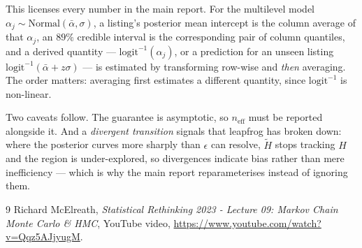 \documentclass[10pt,a4paper]{article}
\theoremstyle{definition}
\begin{document}
This licenses every number in the main report. For the multilevel model
$\alpha_{j} \sim \mathrm{Normal}(\bar\alpha, \sigma)$, a listing's posterior
mean intercept is the column average of that $\alpha_{j}$, an $89\%$ credible
interval is the corresponding pair of column quantiles, and a derived quantity
--- $\mathrm{logit}^{-1}(\alpha_{j})$, or a prediction for an unseen listing
$\mathrm{logit}^{-1}(\bar\alpha + z\sigma)$ --- is estimated by transforming
row-wise and \emph{then} averaging. The order matters: averaging first
estimates a different quantity, since $\mathrm{logit}^{-1}$ is non-linear.

Two caveats follow. The guarantee is asymptotic, so $n_{\text{eff}}$ must be
reported alongside it. And a \emph{divergent transition} signals that leapfrog
has broken down: where the posterior curves more sharply than $\epsilon$ can
resolve, $\tilde{H}$ stops tracking $H$ and the region is under-explored, so
divergences indicate bias rather than mere inefficiency --- which is why the
main report reparameterises instead of ignoring them.

\begin{thebibliography}{9}
Richard McElreath, \emph{Statistical Rethinking 2023 - Lecture 09: Markov Chain Monte Carlo \& HMC}, YouTube video, \href{https://www.youtube.com/watch?v=Qqz5AJjyugM\&list=PLDcUM9US4XdMROZ57-OIRtIK0aOynbgZN\&index=9}{https://www.youtube.com/watch?v=Qqz5AJjyugM}.
\end{thebibliography}
\end{document}
